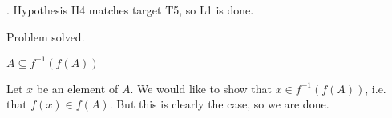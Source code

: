 \documentclass[a4paper,twoside,12pt]{article} %
\makeatletter
\DeclareRobustCommand{\_}{%
  \leavevmode\vbox{%
    \hrule\@width.4em
          \@height-.16ex
          \@depth\dimexpr.16ex+.28pt\relax}}
\newenvironment{fit}{\begin{adjustbox}{max width=\textwidth,max totalheight=\textheight,keepaspectratio}}{\end{adjustbox}}
\makeatother
\begin{document}
\begin{steps}
. Hypothesis H4 matches target T5, so L1 is done.\nopagebreak[4] 
\nopagebreak[4] 
\smallskip\nopagebreak[4] 

\begin{fit}%
\end{fit}

Problem solved.
\cleardoublepage

\end{steps}
{\begin{center} \large \textbf{$A \subseteq f^{-1}(f(A))$}\end{center}}\nopagebreak[4]

\begin{center}
\begin{minipage}{120mm}
Let $x$ be an element of $A$. We would like to show that $x\in f^{-1}(f(A))$, i.e. that $f(x)\in f(A)$. But this is clearly the case, so we are done.
\end{minipage}
\end{center}
\end{document}
